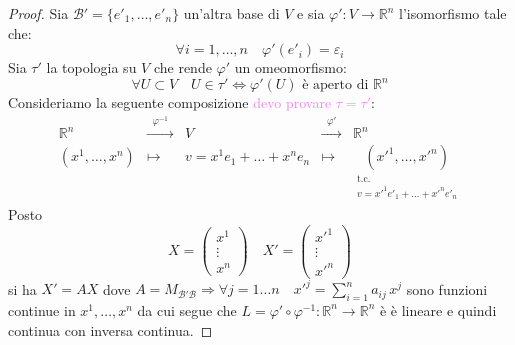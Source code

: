 \begin{esempio}
\begin{proof}
        Sia $\mathcal{B}' = \{e'_1, \dots, e'_n\}$ un'altra base di $V$ e sia $\varphi' \colon V \to \mathbb{R}^n$ l'isomorfismo tale che:
        \[
        \forall i = 1, \dots, n \quad \varphi'(e'_i) = \varepsilon_i
        \]
        Sia $\tau'$ la topologia su $V$ che rende $\varphi'$ un omeomorfismo:
        \[
        \forall U \subset V \quad U \in \tau' \iff \varphi'(U) \text{ è aperto di } \mathbb{R}^n
        \]
        Consideriamo la seguente composizione \textcolor{violet}{devo provare $\tau = \tau'$}:
        \[
        \begin{array}{ccccc}
        \mathbb{R}^n & \xrightarrow{\;\;\varphi^{-1}\;\;} & V & \xrightarrow{\;\;\varphi'\;\;} & \mathbb{R}^n \\[1.5ex]
        (x^1,\dots,x^n) & \longmapsto & v = x^1 e_1+\dots+x^n e_n & \longmapsto &
        \underset{\substack{\text{t.c.}\\ v = x'^1 e'_1+\dots+x'^n e'_n}}{(x'^1,\dots,x'^n)}
        \end{array}
        \]
        Posto
        \[
        X = \begin{pmatrix} x^1 \\ \vdots \\ x^n \end{pmatrix} \quad X' = \begin{pmatrix} x'^1 \\ \vdots \\ x'^n \end{pmatrix}
        \]
        si ha $X' = AX$ dove $\displaystyle A = M_{\mathcal{B}'\mathcal{B}} \Rightarrow \forall j =1 \ldots n \quad x'^j = \sum_{i=1}^{n} a_{ij} \, x^j$
        sono funzioni continue in $x^1, \dots, x^n$ da cui segue che $L=\varphi' \circ \varphi^{-1} \colon \mathbb{R}^n \to \mathbb{R}^n$ è  è lineare e quindi continua con inversa continua.


\end{proof}
\end{esempio}
